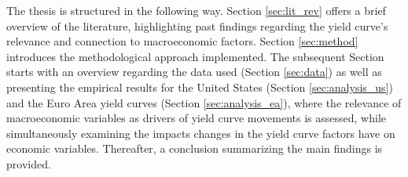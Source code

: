 The thesis is structured in the following way. 
Section \ref{sec:lit_rev} offers a brief overview of the literature, highlighting past findings regarding the yield curve's relevance and connection to macroeconomic factors. 
Section \ref{sec:method} introduces the methodological approach implemented.
The subsequent Section starts with an overview regarding the data used (Section \ref{sec:data}) as well as presenting the empirical results for the United States (Section \ref{sec:analysis_us}) and the Euro Area yield curves (Section \ref{sec:analysis_ea}), where the relevance of macroeconomic variables as drivers of yield curve movements is assessed, while simultaneously examining the impacts changes in the yield curve factors have on economic variables.   
Thereafter, a conclusion summarizing the main findings is provided. 










